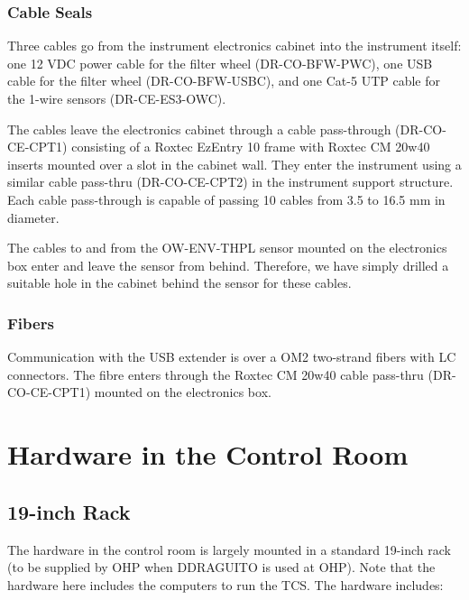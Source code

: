 \documentclass{article}
\begin{document}
\subsubsection{Cable Seals}

Three cables go from the instrument electronics cabinet into the instrument itself: one 12 VDC power cable for the filter wheel (DR-CO-BFW-PWC), one USB cable for the filter wheel (DR-CO-BFW-USBC), and one Cat-5 UTP cable for the 1-wire sensors (DR-CE-ES3-OWC). 

The cables leave the electronics cabinet through a cable pass-through (DR-CO-CE-CPT1) consisting of a Roxtec EzEntry 10 frame with Roxtec CM 20w40 inserts mounted over a slot in the cabinet wall. They enter the instrument using a similar cable pass-thru (DR-CO-CE-CPT2) in the instrument support structure. Each cable pass-through is capable of passing 10 cables from 3.5 to 16.5 mm in diameter. 

The cables to and from the OW-ENV-THPL sensor mounted on the electronics box enter and leave the sensor from behind. Therefore, we have simply drilled a suitable hole in the cabinet behind the sensor for these cables.

\subsubsection{Fibers}

Communication with the USB extender is over a OM2 two-strand fibers with LC connectors. The fibre enters through the Roxtec CM 20w40 cable pass-thru (DR-CO-CE-CPT1)  mounted on the electronics box.

\clearpage
\section{Hardware in the Control Room}

\subsection{19-inch Rack}

The hardware in the control room is largely mounted in a standard 19-inch rack (to be supplied by OHP when DDRAGUITO is used at OHP). Note that the hardware here includes the computers to run the TCS. The hardware includes:
\end{document}
